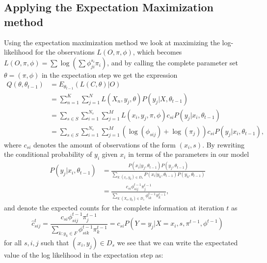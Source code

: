\subsection{Applying the Expectation Maximization method}
Using the expectation maximization method we look at maximizing the log-likelihood for the observations $L(O,\pi,\phi)$, which becomes $L(O,\pi,\phi)=\sum \log (\sum \phi_{ji}^{s_i}\pi_i)$, and by calling the complete parameter set $\theta = (\pi, \phi)$ in the expectation step we get the expression 
\begin{equation*}
\begin{split}
Q(\theta,\theta_{t-1})%
&=E_{\theta_{t-1}}\left ( L(C,\theta) | O \right )\\
&= \sum_{n=1}^K \sum_{j=1}^N
L(X_n, y_j,\theta)
P(y_j|X,\theta_{t-1})\\
&= \sum_{s \in S} \sum_{i=1}^{N_s} \sum_{j=1}^M 
L(x_i,y_j,\pi,\phi)
c_{si}P(y_j|x_i,\theta_{t-1})\\
&= \sum_{s \in S} \sum_{i=1}^{N_s} \sum_{j=1}^M 
(\log(\phi_{sij}) + \log(\pi_j))
c_{si}P(y_j|x_i,\theta_{t-1}),
\end{split}
\end{equation*}
where $c_{si}$ denotes the amount of observations of the form $(x_i,s)$. By rewriting the conditional probability of $y_i$ given $x_i$ in terms of the parameters in our model
\begin{equation*}
\begin{split}
P(y_j|x_i,\theta_{t-1})
&=\frac{P(x_i|y_j,\theta_{t-1})P(y_j,\theta_{t-1})}
{\sum_{k:(x_i,y_k)\in D_s}P(x_i|y_k,\theta_{t-1})P(y_k,\theta_{t-1})}\\
&=\frac{c_{si}\phi^{t-1}_{sij}\pi^{t-1}_{j}}
{\sum_{k:(X_n,y_k)\in D_{s}}\phi^{t-1}_{ik}\pi^{t-1}_{k}},
\end{split}
\end{equation*}
and denote the expected counts for the complete information at iteration $t$ as 
\begin{equation*}
\hat c^t_{sij} = \frac{c_{si}\phi^{t-1}_{sij}\pi^{t-1}_{j}}{\sum_{k: y_k \in F}\phi^{t-1}_{sik}\pi^{t-1}_{k}} = c_{si}P(Y=y_j|X=x_i,s,\pi^{t-1}, \phi^{t-1})
\end{equation*}
for all $s,i,j$ such that $(x_i,y_j)\in D_s$ we see that we can write the expectated value of the log likelihood in the expectation step as:
